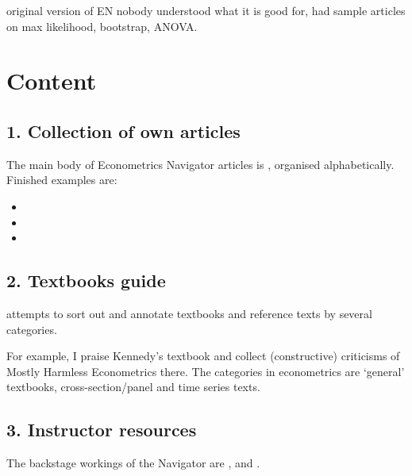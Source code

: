 \documentclass[letterpaper,10pt,english]{sphinxmanual}
\begin{document}
 original version of EN nobody understood what it is good for,
had sample articles on max likelihood, bootstrap, ANOVA.


\section{Content}
\label{\detokenize{index:content}}

\subsection{1. Collection of own articles}
\label{\detokenize{index:collection-of-own-articles}}
The main body of Econometrics Navigator articles is ,  organised alphabetically. Finished examples are:
\begin{itemize}
\item {} 

\item {} 

\item {} 

\end{itemize}


\subsection{2. Textbooks guide}
\label{\detokenize{index:textbooks-guide}}
 attempts to sort out and annotate textbooks and
reference texts by several categories.

For example, I praise Kennedy’s textbook and
collect (constructive) criticisms of Mostly Harmless Econometrics there. The categories
in econometrics are ‘general’ textbooks, cross-section/panel and time series texts.


\subsection{3. Instructor resources}
\label{\detokenize{index:instructor-resources}}
The backstage workings of the Navigator are ,
 and
.
\end{document}
